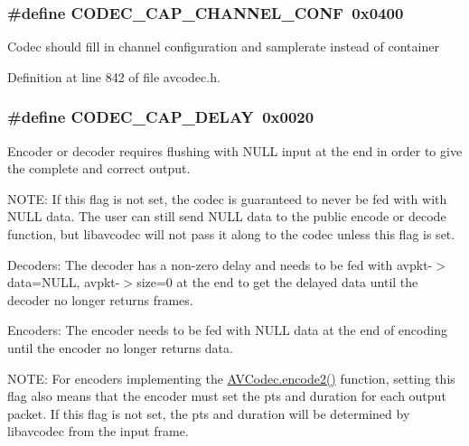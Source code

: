 \subsubsection[{\texorpdfstring{C\+O\+D\+E\+C\+\_\+\+C\+A\+P\+\_\+\+C\+H\+A\+N\+N\+E\+L\+\_\+\+C\+O\+NF}{CODEC_CAP_CHANNEL_CONF}}]{\setlength{\rightskip}{0pt plus 5cm}\#define C\+O\+D\+E\+C\+\_\+\+C\+A\+P\+\_\+\+C\+H\+A\+N\+N\+E\+L\+\_\+\+C\+O\+NF~0x0400}\hypertarget{group__lavc__core_ga874b2baf9dd2bb3abff21bc77da6b9ba}{}\label{group__lavc__core_ga874b2baf9dd2bb3abff21bc77da6b9ba}
Codec should fill in channel configuration and samplerate instead of container 

Definition at line 842 of file avcodec.\+h.

\subsubsection[{\texorpdfstring{C\+O\+D\+E\+C\+\_\+\+C\+A\+P\+\_\+\+D\+E\+L\+AY}{CODEC_CAP_DELAY}}]{\setlength{\rightskip}{0pt plus 5cm}\#define C\+O\+D\+E\+C\+\_\+\+C\+A\+P\+\_\+\+D\+E\+L\+AY~0x0020}\hypertarget{group__lavc__core_gad81abca6e6ea7e0ac25f328e7425698f}{}\label{group__lavc__core_gad81abca6e6ea7e0ac25f328e7425698f}
Encoder or decoder requires flushing with N\+U\+LL input at the end in order to give the complete and correct output.

N\+O\+TE\+: If this flag is not set, the codec is guaranteed to never be fed with with N\+U\+LL data. The user can still send N\+U\+LL data to the public encode or decode function, but libavcodec will not pass it along to the codec unless this flag is set.

Decoders\+: The decoder has a non-\/zero delay and needs to be fed with avpkt-\/$>$data=N\+U\+LL, avpkt-\/$>$size=0 at the end to get the delayed data until the decoder no longer returns frames.

Encoders\+: The encoder needs to be fed with N\+U\+LL data at the end of encoding until the encoder no longer returns data.

N\+O\+TE\+: For encoders implementing the \hyperlink{struct_a_v_codec_ac764e717bb18064de8e4608b8dce5ca4}{A\+V\+Codec.\+encode2()} function, setting this flag also means that the encoder must set the pts and duration for each output packet. If this flag is not set, the pts and duration will be determined by libavcodec from the input frame. 

